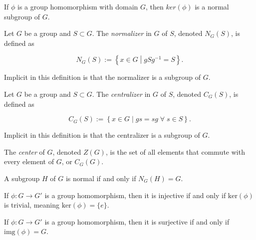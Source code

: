 \begin{theorem}
    \label{theorem : Kernel_normal}
    \leanok
    If $\phi$ is a group homomorphism with domain $G$, then $ker(\phi)$ is a normal subgroup of $G$.
\end{theorem}

\begin{definition}
    \label{definition : Normalizer}
    \leanok
    Let $G$ be a group and $S \subset G$. The \textit{normalizer} in $G$ of $S$, denoted $N_G(S)$, is defined as

    $$N_G(S) := \left\{ x \in G \middle| gSg^{-1} = S \right\}.$$

    Implicit in this definition is that the normalizer is a subgroup of $G$.
\end{definition}

\begin{definition}
    \label{definition : Centralizer}
    \leanok
    Let $G$ be a group and $S \subset G$. The \textit{centralizer} in $G$ of $S$, denoted $C_G(S)$, is defined as

    $$C_G(S) := \left\{ x \in G \middle| gs = sg\;\forall\;s \in S\right\}.$$

    Implicit in this definition is that the centralizer is a subgroup of $G$.
\end{definition}

\begin{definition}
    \label{definition : Center}
    \leanok
    The \textit{center} of $G$, denoted $Z(G)$, is the set of all elements that commute with every element of $G$, or $C_G(G)$.
\end{definition}

\begin{theorem}
    \label{theorem : normal_normalizer}
    A subgroup $H$ of $G$ is normal if and only if $N_G(H) = G$.
\end{theorem}

\begin{theorem}
    \label{theorem : homomorphism_inj_iff_kernel_trivial}
    If $\phi : G \rightarrow G'$ is a group homomorphism, then it is injective if and only if $\text{ker}(\phi)$ is trivial, meaning $\text{ker}(\phi) = \{e\}$.
\end{theorem}

\begin{theorem}
    \label{theorem : homomorphism_surj_iff_image_complete}
    If $\phi : G \rightarrow G'$ is a group homomorphism, then it is surjective if and only if $\text{img}(\phi) = G$.
\end{theorem}
